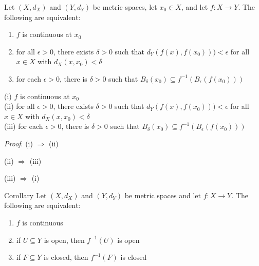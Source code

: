 \documentclass [aspectratio=169]{beamer}
\newcommand{\inv}{{-1}}
\begin{document}
\begin{frame}
\begin{theorem}
\label{thm:cont_equiv}
Let $(X,d_X)$ and $(Y,d_Y)$ be metric spaces, let $x_0 \in X$, and let $f:X\to Y$. The following are equivalent:
\begin{enumerate}
    \item[(i)] $f$ is continuous at $x_0$
    \item[(ii)] for all $\epsilon>0$, there exists $\delta > 0$ such that $d_Y(f(x),f(x_0))) < \epsilon$ for all $x \in X$ with $d_X(x,x_0) < \delta$
    \item[(iii)] for each $\epsilon>0$, there is $\delta > 0$ such that $B_\delta(x_0) \subseteq f^{-1} (B_\epsilon(f(x_0)))$
\end{enumerate}
\end{theorem}
\end{frame}


\begin{frame}
\small
(i) $f$ is continuous at $x_0$ \\
(ii) for all $\epsilon>0$, there exists $\delta > 0$ such that $d_Y(f(x),f(x_0))) < \epsilon$ for all $x \in X$ with $d_X(x,x_0) < \delta$\\
(iii) for each $\epsilon>0$, there is $\delta > 0$ such that $B_\delta(x_0) \subseteq f^{-1} (B_\epsilon(f(x_0)))$

\normalsize
\vspace{0.5em}
\textit{Proof}.
(i) $\Rightarrow$ (ii) 
\vspace{5cm}



\end{frame}


\begin{frame}


(ii) $\Rightarrow$ (iii)

\vspace{1.75cm}
(iii) $\Rightarrow$ (i)

\vspace{4.75cm}

\end{frame}


\begin{frame}
\begin{exampleblock}{Corollary}
Let $(X,d_X)$ and $(Y,d_Y)$ be metric spaces and let $f:X\to Y$. The following are equivalent:
\begin{enumerate}
    \item[(i)] $f$ is continuous
    \item[(ii)] if $U \subseteq Y$ is open, then $f^\inv(U)$ is open
    \item[(iii)] if $F \subseteq Y$ is closed, then $f^\inv(F)$ is closed
\end{enumerate}
\end{exampleblock}

\end{frame}
\end{document}
